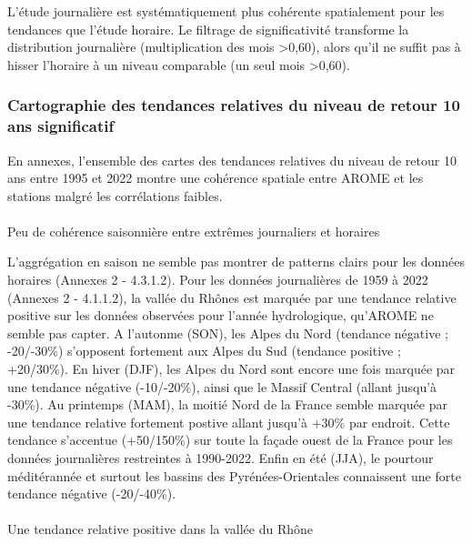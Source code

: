 \documentclass[
  article,
  nofooter,
  noheadings]{jss}
\makeatletter
\let\oldparagraph\paragraph
\renewcommand{\paragraph}{
    \@ifstar
      \xxxParagraphStar
      \xxxParagraphNoStar
  }
\newcommand{\xxxParagraphStar}[1]{\oldparagraph*{#1}\mbox{}}
\newcommand{\xxxParagraphNoStar}[1]{\oldparagraph{#1}\mbox{}}
\makeatother
\begin{document}
L'étude journalière est systématiquement plus cohérente spatialement
pour les tendances que l'étude horaire. Le filtrage de significativité
transforme la distribution journalière (multiplication des mois
\textgreater0,60), alors qu'il ne suffit pas à hisser l'horaire à un
niveau comparable (un seul mois \textgreater0,60).

\subsubsection{Cartographie des tendances relatives du niveau de retour
10 ans
significatif}\label{cartographie-des-tendances-relatives-du-niveau-de-retour-10-ans-significatif}

En annexes, l'ensemble des cartes des tendances relatives du niveau de
retour 10 ans entre 1995 et 2022 montre une cohérence spatiale entre
AROME et les stations malgré les corrélations faibles.

\paragraph{Peu de cohérence saisonnière entre extrêmes journaliers et
horaires}\label{peu-de-cohuxe9rence-saisonniuxe8re-entre-extruxeames-journaliers-et-horaires}

L'aggrégation en saison ne semble pas montrer de patterns clairs pour
les données horaires (Annexes 2 - 4.3.1.2). Pour les données
journalières de 1959 à 2022 (Annexes 2 - 4.1.1.2), la vallée du Rhônes
est marquée par une tendance relative positive sur les données observées
pour l'année hydrologique, qu'AROME ne semble pas capter. A l'autonme
(SON), les Alpes du Nord (tendance négative ; -20/-30\%) s'opposent
fortement aux Alpes du Sud (tendance positive ; +20/30\%). En hiver
(DJF), les Alpes du Nord sont encore une fois marquée par une tendance
négative (-10/-20\%), ainsi que le Massif Central (allant jusqu'à
-30\%). Au printemps (MAM), la moitié Nord de la France semble marquée
par une tendance relative fortement postive allant jusqu'à +30\% par
endroit. Cette tendance s'accentue (+50/150\%) sur toute la façade ouest
de la France pour les données journalières restreintes à 1990-2022.
Enfin en été (JJA), le pourtour méditérannée et surtout les bassins des
Pyrénées-Orientales connaissent une forte tendance négative (-20/-40\%).

\paragraph{Une tendance relative positive dans la vallée du
Rhône}\label{une-tendance-relative-positive-dans-la-valluxe9e-du-rhuxf4ne}
\end{document}
